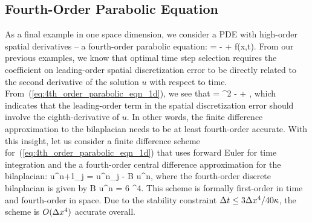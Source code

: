 \documentclass[oneeqnum,onefignum,onetabnum,onethmnum]{siamltex}
\begin{document}
\subsection{Fourth-Order Parabolic Equation}
As a final example in one space dimension, we consider a PDE with high-order
spatial derivatives -- a fourth-order parabolic equation: 
\beq
   = -\kappa {} + f(x,t).
  \label{eq:4th_order_parabolic_eqn_1d}
\eeq
From our previous examples, we know that optimal time step selection requires 
the coefficient on leading-order spatial discretization error to be directly 
related to the second derivative of the solution $u$ with respect to time.  
From~(\ref{eq:4th_order_parabolic_eqn_1d}), we see that 
\beq
   = 
    \kappa^2  
  - \kappa {} 
  + 
  \label{eq:4th_order_parabolic_eqn_1d_second_time_derivative},
\eeq
which indicates that the leading-order term in the spatial discretization 
error should involve the eighth-derivative of $u$.  In other words, the
finite difference approximation to the bilaplacian needs to be at least 
fourth-order accurate.  With this insight, let us consider a finite 
difference scheme for~(\ref{eq:4th_order_parabolic_eqn_1d}) that 
uses forward Euler for time integration and the a fourth-order central 
difference approximation for the bilaplacian:
\bea
  u^{n+1}_j = u^{n}_j - \kappa \dt B u^n, 
  \label{eq:4th_order_parabolic_eqn_1d_FD_scheme}
\eea
where the fourth-order discrete bilaplacian is given by
\beq
  B u^n = 
               {6 \dx^4}.
\eeq
This scheme is formally first-order in time and fourth-order in space.  
Due to the stability constraint $\Delta t \le 3\Delta x^4/40 \kappa$, the scheme is 
$O(\Delta x^4)$ accurate overall.
\end{document}
